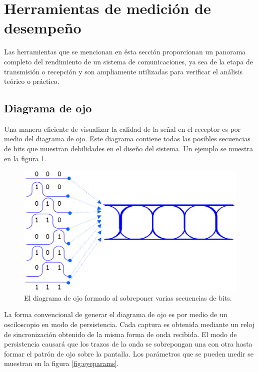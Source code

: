 
\section{Herramientas de medici\'on de desempe\~no}
Las herramientas que se mencionan en \'esta secci\'on proporcionan un panorama completo del
rendimiento de un sistema de comunicaciones, ya sea de la etapa de transmisi\'on o recepci\'on y
son ampliamente utilizadas para verificar el an\'alisis te\'orico o pr\'actico.

\subsection{Diagrama de ojo}
Una manera eficiente de visualizar la calidad de la se\~nal en el receptor es por medio del diagrama
de ojo. Este diagrama contiene todas las posibles secuencias de bits que muestran debilidades en el
dise\~no del sistema. Un ejemplo se muestra en la figura \ref{fig:eyeform}\cite{foster}.

\begin{figure}[htp]
\centering
	\includegraphics[width=5.5in]{figs/eyeform}
	\caption{El diagrama de ojo formado al sobreponer varias secuencias de bits.}
	\label{fig:eyeform}
\end{figure}

La forma convencional de generar el diagrama de ojo es por medio de un osciloscopio en modo de
persistencia. Cada captura es obtenida mediante un reloj de sincronizaci\'on obtenido de la misma
forma de onda recibida. El modo de persistencia causar\'a que los trazos de la onda se sobrepongan
una con otra hasta formar el patr\'on de ojo sobre la pantalla. Los par\'ametros que se pueden
medir se muestran en la figura \ref{fig:eyeparams}\cite{breed}.

